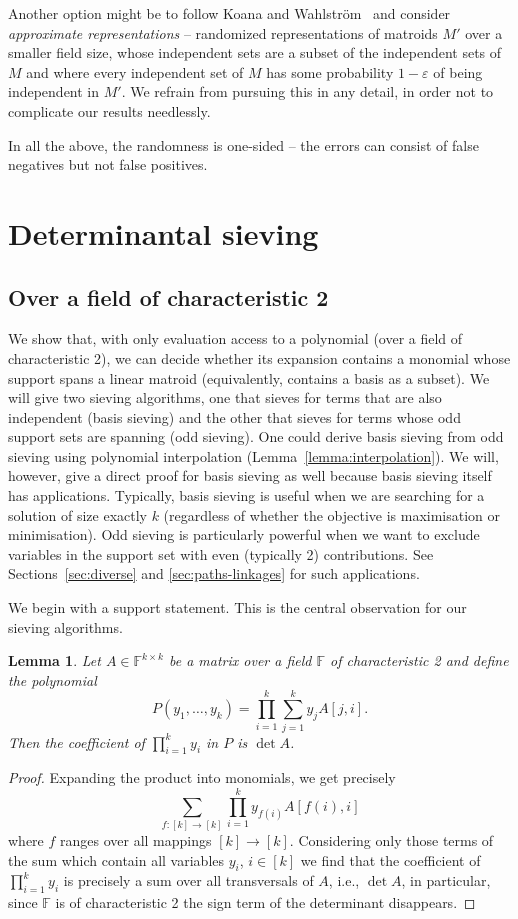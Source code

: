 \documentclass[10pt,a4paper]{article}
\newtheorem{lemma}{Lemma}[section]
\newcommand{\F}{\ensuremath{\mathbb F}\xspace}
\begin{document}
Another option might be to follow Koana and Wahlström~\cite{KoanaW25stacs}
and consider \emph{approximate representations} -- randomized
representations of matroids $M'$ over a smaller field size, whose
independent sets are a subset of the independent sets of $M$
and where every independent set of $M$ has some probability $1-\varepsilon$
of being independent in $M'$. We refrain from pursuing this in any detail,
in order not to complicate our results needlessly.

In all the above, the randomness is one-sided -- the errors can
consist of false negatives but not false positives. 


\section{Determinantal sieving}
\label{sec:sieving} 

\subsection{Over a field of characteristic 2}

We show that, with only evaluation access to a polynomial (over a
field of characteristic 2), we  can decide whether its expansion contains a monomial whose support spans a linear matroid
(equivalently, contains a basis as a subset).
We will give two sieving algorithms, one that sieves for terms that are also independent (basis sieving) and the other that sieves for terms whose odd support sets are spanning (odd sieving).
One could derive basis sieving from odd sieving using polynomial interpolation (Lemma~\ref{lemma:interpolation}).
We will, however, give a direct proof for basis sieving as well because basis sieving itself has applications.
Typically, basis sieving is useful when we are searching for a solution of size exactly $k$ (regardless of whether the objective is maximisation or minimisation).
Odd sieving is particularly powerful when we want to exclude variables in the support set with even (typically 2) contributions.
See Sections~\ref{sec:diverse} and \ref{sec:paths-linkages} for such applications.

We begin with a support statement. This is the central observation
for our sieving algorithms.

\begin{lemma} \label{lemma:sieve-determinant}
  Let $A \in \F^{k \times k}$ be a matrix over a field $\F$ of
  characteristic 2 and define the polynomial
  \[
    P(y_1,\ldots,y_k) = \prod_{i=1}^k \sum_{j=1}^k y_j A[j,i].
  \]
  Then the coefficient of $\prod_{i=1}^k y_i$ in $P$
  is $\det A$. 
\end{lemma}
\begin{proof}
  Expanding the product into monomials, we get precisely
  \[
    \sum_{f \colon [k] \to [k]} \prod_{i=1}^k y_{f(i)} A[f(i),i]
  \]
  where $f$ ranges over all mappings $[k] \to [k]$.
  Considering only those terms of the sum which contain
  all variables $y_i$, $i \in [k]$ we find that the coefficient of
  $\prod_{i=1}^k y_i$ is precisely a sum over all transversals of $A$,
  i.e., $\det A$, in particular, since $\F$ is of characteristic 2
  the sign term of the determinant disappears. 
\end{proof}
\end{document}
